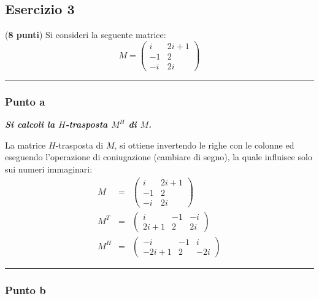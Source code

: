 \documentclass[a4paper]{article}
\newcommand{\longline}{\noindent\rule{\textwidth}{0.4pt}}
\begin{document}
	\subsection{Esercizio 3}

	(\textbf{8 punti}) Si consideri la seguente matrice:
	\begin{equation*}
		M = \begin{pmatrix}
			i	& 2i+1	\\
			-1	& 2		\\
			-i	& 2i
		\end{pmatrix}
	\end{equation*}
	
	\longline

	\subsubsection{Punto a}

	\textcolor{Green4}{\textbf{\emph{Si calcoli la $H$-trasposta $M^{H}$ di $M$.}}}\newline

	\noindent
	La matrice $H$-trasposta di $M$, si ottiene invertendo le righe con le colonne ed eseguendo l'operazione di coniugazione (cambiare di segno), la quale influisce solo sui numeri immaginari:
	\begin{equation*}
		\begin{array}{lll}
			M &=& \begin{pmatrix}
				i	& 2i+1	\\
				-1	& 2		\\
				-i	& 2i
			\end{pmatrix} \\ [2	em]
			M^{T} &=& \begin{pmatrix}
				i 		& -1	& -i \\
				2i+1	& 2		& 2i
			\end{pmatrix} \\ [2em]
			M^{H} &=& \begin{pmatrix}
				-i 		& -1	& i \\
				-2i+1	& 2		& -2i
			\end{pmatrix}
		\end{array}
	\end{equation*}

	\longline

	\subsubsection{Punto b}
\end{document}
